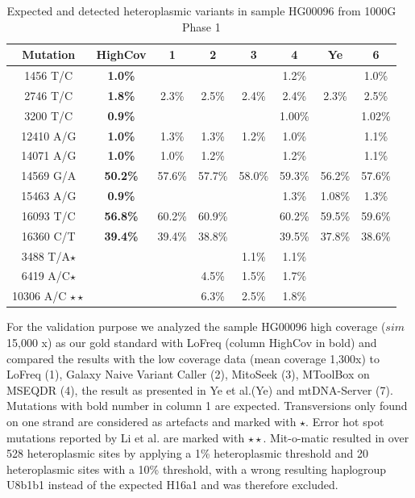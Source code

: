\begin{table}[h]
\centering
\caption{Expected and detected heteroplasmic variants in sample HG00096 from 1000G Phase 1}
\label{table:hg00096}
\begin{tabular}{c|c|cccccc}
\hline
Mutation & HighCov & 1 & 2 & 3 & 4 & Ye & 6 \\
\hline
1456 T/C & \textbf{1.0\%} & & & & 1.2\% & & 1.0\%\\
2746 T/C & \textbf{1.8\%} & 2.3\% & 2.5\% &2.4\% & 2.4\% & 2.3\% & 2.5\%\\
3200 T/C &\textbf{0.9\%} & & & & 1.00\% & & 1.02\%\\
12410 A/G & \textbf{1.0\%} & 1.3\% &1.3\%  & 1.2\% & 1.0\% & & 1.1\%\\
14071 A/G &\textbf{1.0\%} & 1.0\% & 1.2\% & & 1.2\%& & 1.1\%\\
14569 G/A &\textbf{50.2\%} & 57.6\% & 57.7\% & 58.0\% & 59.3\% &56.2\%& 57.6\% \\
15463 A/G & \textbf{0.9\%} & & & & 1.3\% & 1.08\% &1.3\%\\
16093 T/C& \textbf{56.8\%} & 60.2\% & 60.9\% & & 60.2\% & 59.5\% &59.6\% \\
16360 C/T &\textbf{39.4\%} & 39.4\% & 38.8\%& &  39.5\% & 37.8\% &38.6\% \\
3488 T/A$\star$ & & & & 1.1\% & 1.1\% &  \\
6419 A/C$\star$  & &  & 4.5\% & 1.5\%& 1.7\% \\
10306 A/C $\star \star$& & & 6.3\% & 2.5\% & 1.8\% &  \\

\end{tabular}
\end{table}
For the validation purpose we analyzed the sample HG00096 high coverage ($sim$ 15,000 x) as our gold standard with LoFreq (column HighCov in bold) and compared the results with the low coverage data (mean coverage 1,300x) to LoFreq (1), Galaxy Naive Variant Caller (2), MitoSeek (3), MToolBox on MSEQDR (4), the result as presented in Ye et al.\cite{Ye2014}(Ye) and mtDNA-Server (7).  Mutations with bold number in column 1 are expected. 
Transversions only found on one strand are considered as artefacts and marked with $\star$. Error hot spot
mutations reported by Li et al. \cite{Li2010} are marked with $\star \star$. Mit-o-matic resulted in over 528 heteroplasmic sites by applying a 1\% heteroplasmic threshold and  20 heteroplasmic sites with a 10\% threshold, with a wrong resulting haplogroup U8b1b1 instead of the expected H16a1 and was therefore excluded.\\

